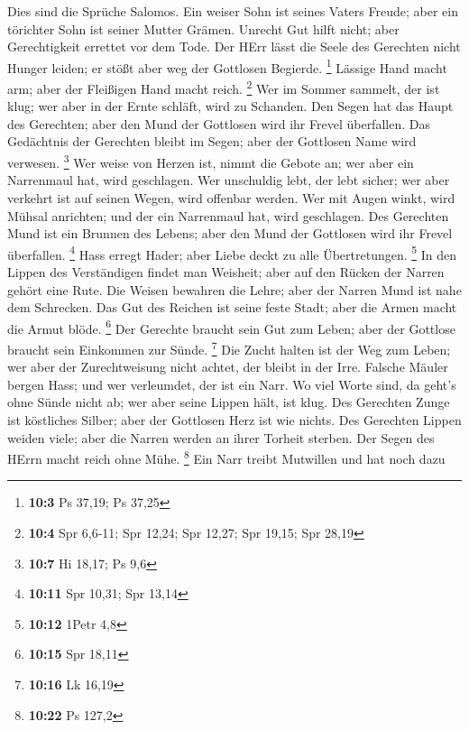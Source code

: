  Dies sind die Sprüche Salomos. Ein weiser Sohn ist seines
Vaters Freude; aber ein törichter Sohn ist seiner Mutter Grämen.
 Unrecht Gut hilft nicht; aber Gerechtigkeit errettet vor
dem Tode.  Der HErr lässt die Seele des Gerechten nicht
Hunger leiden; er stößt aber weg der Gottlosen Begierde. \footnote{\textbf{10:3}
  Ps 37,19; Ps 37,25}  Lässige Hand macht arm; aber der
Fleißigen Hand macht reich. \footnote{\textbf{10:4} Spr 6,6-11; Spr
  12,24; Spr 12,27; Spr 19,15; Spr 28,19}  Wer im Sommer
sammelt, der ist klug; wer aber in der Ernte schläft, wird zu Schanden.
 Den Segen hat das Haupt des Gerechten; aber den Mund der
Gottlosen wird ihr Frevel überfallen.  Das Gedächtnis der
Gerechten bleibt im Segen; aber der Gottlosen Name wird verwesen.
\footnote{\textbf{10:7} Hi 18,17; Ps 9,6}  Wer weise von
Herzen ist, nimmt die Gebote an; wer aber ein Narrenmaul hat, wird
geschlagen.  Wer unschuldig lebt, der lebt sicher; wer
aber verkehrt ist auf seinen Wegen, wird offenbar werden.
 Wer mit Augen winkt, wird Mühsal anrichten; und der ein
Narrenmaul hat, wird geschlagen.  Des Gerechten Mund ist
ein Brunnen des Lebens; aber den Mund der Gottlosen wird ihr Frevel
überfallen. \footnote{\textbf{10:11} Spr 10,31; Spr 13,14}
 Hass erregt Hader; aber Liebe deckt zu alle
Übertretungen. \footnote{\textbf{10:12} 1Petr 4,8}  In
den Lippen des Verständigen findet man Weisheit; aber auf den Rücken der
Narren gehört eine Rute.  Die Weisen bewahren die Lehre;
aber der Narren Mund ist nahe dem Schrecken.  Das Gut des
Reichen ist seine feste Stadt; aber die Armen macht die Armut blöde.
\footnote{\textbf{10:15} Spr 18,11}  Der Gerechte braucht
sein Gut zum Leben; aber der Gottlose braucht sein Einkommen zur Sünde.
\footnote{\textbf{10:16} Lk 16,19}  Die Zucht halten ist
der Weg zum Leben; wer aber der Zurechtweisung nicht achtet, der bleibt
in der Irre.  Falsche Mäuler bergen Hass; und wer
verleumdet, der ist ein Narr.  Wo viel Worte sind, da
geht's ohne Sünde nicht ab; wer aber seine Lippen hält, ist klug.
 Des Gerechten Zunge ist köstliches Silber; aber der
Gottlosen Herz ist wie nichts.  Des Gerechten Lippen
weiden viele; aber die Narren werden an ihrer Torheit sterben.
 Der Segen des HErrn macht reich ohne Mühe. \footnote{\textbf{10:22}
  Ps 127,2}  Ein Narr treibt Mutwillen und hat noch dazu
